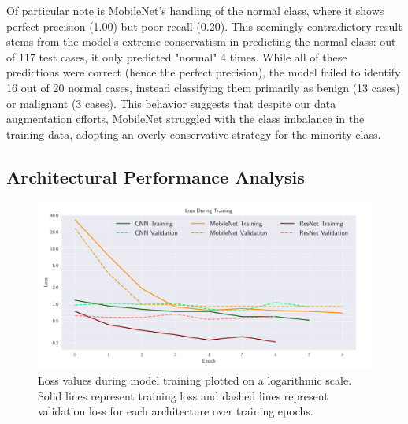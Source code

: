 Of particular note is MobileNet's handling of the normal class, where it shows perfect precision (1.00) but poor recall (0.20). This seemingly contradictory result stems from the model's extreme conservatism in predicting the normal class: out of 117 test cases, it only predicted "normal" 4 times. While all of these predictions were correct (hence the perfect precision), the model failed to identify 16 out of 20 normal cases, instead classifying them primarily as benign (13 cases) or malignant (3 cases). This behavior suggests that despite our data augmentation efforts, MobileNet struggled with the class imbalance in the training data, adopting an overly conservative strategy for the minority class.

\onecolumngrid
\subsection{Architectural Performance Analysis }

\begin{figure}[h!]
    \begin{minipage}{\textwidth}
        \centering
        \includegraphics[width = .9\textwidth]{../figs/cnn_loss.pdf}
        \caption{Loss values during model training plotted on a logarithmic scale. Solid lines represent training loss and dashed lines represent validation loss for each architecture over training epochs.}
        \label{fig:loss_curves}
    \end{minipage}
\end{figure}

